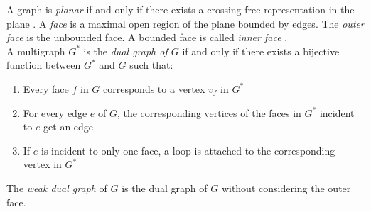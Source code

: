 A graph is \emph{planar} if and only if there exists a crossing-free representation in the plane \cite[Page 100]{DBLP:cormen_intro_to_algorithms}.
A \emph{face} is a maximal open region of the plane bounded by edges. The \emph{outer face} is the unbounded face. A bounded face is called \emph{inner face} \cite[S. 86]{Diestel_GraphTheory}.\\
A multigraph $G^*$ is the \emph{dual graph of $G$} if and only if there exists a bijective function between $G^*$ and $G$ such that:
\begin{enumerate}
	\item Every face $f$ in $G$ corresponds to a vertex $v_f$ in $G^*$
	\item For every edge $e$ of $G$, the corresponding vertices of the faces in $G^*$ incident to $e$ get an edge 
	\item If $e$ is incident to only one face, a loop is attached to the corresponding vertex in $G^*$
\end{enumerate}\cite[P. 103]{Diestel_GraphTheory}
The \emph{weak dual graph} of $G$ is the dual graph of $G$ without considering the outer face.


